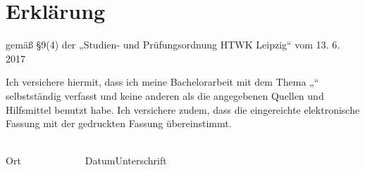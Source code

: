 \chapter*{Erklärung}
\thispagestyle{empty}

\noindent
gemäß §9(4) der „Studien- und Prüfungsordnung HTWK Leipzig“ vom 13. 6. 2017

\medskip
\noindent
Ich versichere hiermit, dass ich meine Bachelorarbeit mit dem Thema „\Titel“ selbstständig verfasst und keine anderen als die angegebenen Quellen und Hilfsmittel benutzt habe. Ich versichere zudem, dass die eingereichte elektronische Fassung mit der gedruckten Fassung übereinstimmt.


\vspace{3cm}
\noindent
\underline{\hspace{5cm}}\hfill\underline{\hspace{6cm}}\\
Ort~~~~~~~~~~~~~Datum\hfill Unterschrift\hspace{3.6cm}